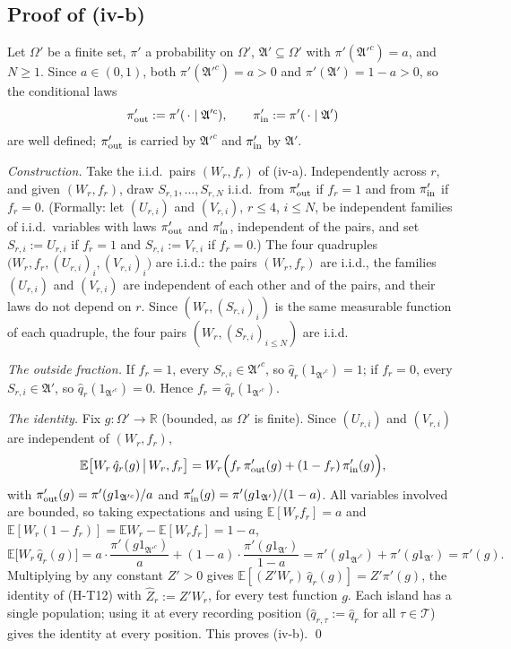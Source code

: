 \documentclass[11pt]{article}
\theoremstyle{remark}
\newcommand{\A}{\mathfrak{A}}
\begin{document}
\subsection{Proof of (iv-b)}
Let $\Omega'$ be a finite set, $\pi'$ a probability on $\Omega'$, $\A'\subseteq\Omega'$ with $\pi'(\A'^c)=a$, and
$N\ge1$. Since $a\in(0,1)$, both $\pi'(\A'^c)=a>0$ and $\pi'(\A')=1-a>0$, so the conditional laws
\[
  \pi'_{\rm out}:=\pi'(\,\cdot\mid\A'^c),\qquad \pi'_{\rm in}:=\pi'(\,\cdot\mid\A')
\]
are well defined; $\pi'_{\rm out}$ is carried by $\A'^c$ and $\pi'_{\rm in}$ by $\A'$.

\emph{Construction.} Take the i.i.d.\ pairs $(W_r,f_r)$ of (iv-a). Independently across $r$, and given $(W_r,f_r)$,
draw $S_{r,1},\dots,S_{r,N}$ i.i.d.\ from $\pi'_{\rm out}$ if $f_r=1$ and from $\pi'_{\rm in}$ if $f_r=0$. (Formally:
let $(U_{r,i})$ and $(V_{r,i})$, $r\le4$, $i\le N$, be independent families of i.i.d.\ variables with laws
$\pi'_{\rm out}$ and $\pi'_{\rm in}$, independent of the pairs, and set $S_{r,i}:=U_{r,i}$ if $f_r=1$ and
$S_{r,i}:=V_{r,i}$ if $f_r=0$.) The four quadruples $\big(W_r,f_r,(U_{r,i})_i,(V_{r,i})_i\big)$ are i.i.d.: the
pairs $(W_r,f_r)$ are i.i.d., the families $(U_{r,i})$ and $(V_{r,i})$ are independent of each other and of the
pairs, and their laws do not depend on $r$. Since $(W_r,(S_{r,i})_i)$ is the same measurable function of each
quadruple, the four pairs $(W_r,(S_{r,i})_{i\le N})$ are i.i.d.

\emph{The outside fraction.} If $f_r=1$, every $S_{r,i}\in\A'^c$, so $\hat q_r(1_{\A'^c})=1$; if $f_r=0$, every
$S_{r,i}\in\A'$, so $\hat q_r(1_{\A'^c})=0$. Hence $f_r=\hat q_r(1_{\A'^c})$.

\emph{The identity.} Fix $g:\Omega'\to\mathbb R$ (bounded, as $\Omega'$ is finite). Since $(U_{r,i})$ and $(V_{r,i})$ are
independent of $(W_r,f_r)$,
\[
  \mathbb E\big[W_r\,\hat q_r(g)\,\big|\,W_r,f_r\big]
  =W_r\Big(f_r\,\pi'_{\rm out}(g)+(1-f_r)\,\pi'_{\rm in}(g)\Big),
\]
with $\pi'_{\rm out}(g)=\pi'(g1_{\A'^c})/a$ and $\pi'_{\rm in}(g)=\pi'(g1_{\A'})/(1-a)$. All variables involved are
bounded, so taking expectations and using $\mathbb E[W_rf_r]=a$ and $\mathbb E[W_r(1-f_r)]=\mathbb EW_r-\mathbb E[W_rf_r]=1-a$,
\[
  \mathbb E\big[W_r\,\hat q_r(g)\big]=a\cdot\frac{\pi'(g1_{\A'^c})}{a}+(1-a)\cdot\frac{\pi'(g1_{\A'})}{1-a}
  =\pi'(g1_{\A'^c})+\pi'(g1_{\A'})=\pi'(g).
\]
Multiplying by any constant $Z'>0$ gives $\mathbb E[(Z'W_r)\,\hat q_r(g)]=Z'\pi'(g)$, the identity of (H-T12) with
$\hat Z_r:=Z'W_r$, for every test function $g$. Each island has a single population; using it at every recording
position ($\hat q_{r,\tau}:=\hat q_r$ for all $\tau\in\mathcal T$) gives the identity at every position. This proves
(iv-b). \qed
\end{document}
